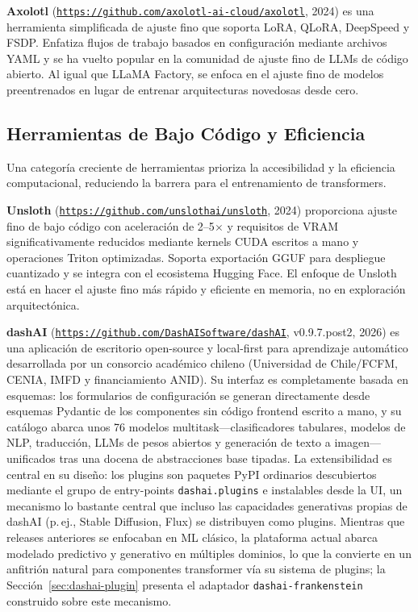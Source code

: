 \textbf{Axolotl} (\texttt{\url{https://github.com/axolotl-ai-cloud/axolotl}}, 2024) es una herramienta simplificada de ajuste fino que soporta LoRA, QLoRA, DeepSpeed y FSDP. Enfatiza flujos de trabajo basados en configuración mediante archivos YAML y se ha vuelto popular en la comunidad de ajuste fino de LLMs de código abierto. Al igual que LLaMA Factory, se enfoca en el ajuste fino de modelos preentrenados en lugar de entrenar arquitecturas novedosas desde cero.

\subsection{Herramientas de Bajo Código y Eficiencia}

Una categoría creciente de herramientas prioriza la accesibilidad y la eficiencia computacional, reduciendo la barrera para el entrenamiento de transformers.

\textbf{Unsloth} (\texttt{\url{https://github.com/unslothai/unsloth}}, 2024) proporciona ajuste fino de bajo código con aceleración de 2--5$\times$ y requisitos de VRAM significativamente reducidos mediante kernels CUDA escritos a mano y operaciones Triton optimizadas. Soporta exportación GGUF para despliegue cuantizado y se integra con el ecosistema Hugging Face. El enfoque de Unsloth está en hacer el ajuste fino más rápido y eficiente en memoria, no en exploración arquitectónica.

\textbf{dashAI} (\texttt{\url{https://github.com/DashAISoftware/dashAI}}, v0.9.7.post2, 2026) es una aplicación de escritorio open-source y local-first para aprendizaje automático desarrollada por un consorcio académico chileno (Universidad de Chile/FCFM, CENIA, IMFD y financiamiento ANID). Su interfaz es completamente basada en esquemas: los formularios de configuración se generan directamente desde esquemas Pydantic de los componentes sin código frontend escrito a mano, y su catálogo abarca unos 76 modelos multitask---clasificadores tabulares, modelos de NLP, traducción, LLMs de pesos abiertos y generación de texto a imagen---unificados tras una docena de abstracciones base tipadas. La extensibilidad es central en su diseño: los plugins son paquetes PyPI ordinarios descubiertos mediante el grupo de entry-points \texttt{dashai.plugins} e instalables desde la UI, un mecanismo lo bastante central que incluso las capacidades generativas propias de dashAI (p.\,ej., Stable Diffusion, Flux) se distribuyen como plugins. Mientras que releases anteriores se enfocaban en ML clásico, la plataforma actual abarca modelado predictivo y generativo en múltiples dominios, lo que la convierte en un anfitrión natural para componentes transformer vía su sistema de plugins; la Sección~\ref{sec:dashai-plugin} presenta el adaptador \texttt{dashai-frankenstein} construido sobre este mecanismo.

